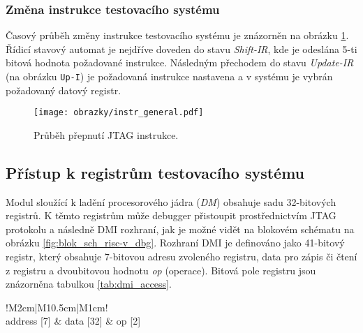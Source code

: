 \subsubsection{Změna instrukce testovacího systému}
Časový průběh změny instrukce testovacího systému je znázorněn na obrázku \ref{fig:jtag_instr}. Řídicí stavový automat je nejdříve doveden do stavu \textit{Shift-IR}, kde je odeslána 5-ti bitová hodnota požadované instrukce. Následným přechodem do stavu \textit{Update-IR} (na obrázku \texttt{Up-I}) je požadovaná instrukce nastavena a v systému je vybrán požadovaný datový registr. 

\begin{figure}[!h]
  \begin{center}
    \texttt{[image: obrazky/instr\_general.pdf]}
  \end{center}
  \caption{Průběh přepnutí \acs{JTAG} instrukce.}
	\label{fig:jtag_instr}
\end{figure}

\subsection{Přístup k registrům testovacího systému}		\label{subsec:dm_reg_access}
Modul sloužící k ladění procesorového jádra (\textit{\acl{DM}}) obsahuje sadu 32-bitových registrů. K těmto registrům může debugger přistoupit prostřednictvím \acs{JTAG} protokolu a následně \acs{DMI} rozhraní, jak je možné vidět na blokovém schématu na obrázku \ref{fig:blok_sch_risc-v_dbg}. Rozhraní \acs{DMI} je definováno jako 41-bitový registr, který obsahuje 7-bitovou adresu zvoleného registru, data pro zápis či čtení z registru a dvoubitovou hodnotu \textit{op} (operace). Bitová pole registru jsou znázorněna tabulkou \ref{tab:dmi_access}. \cite{risc-v_dbg}

\begin{table}[H]
  \caption{Formát datového registru pro přístup k registrům testovacího systému. \cite{risc-v_dbg}}
  \begin{center}
  	\small
	  \begin{tabular}{!{\vrule width 1.2pt}M{2cm}|M{10.5cm}|M{1cm}!{\vrule width 1.2pt}}
				\\
				\hline
				address [7] & data [32] & op [2]\\
				\hline
		\end{tabular}
  \end{center}
	\label{tab:dmi_access}
\end{table}

